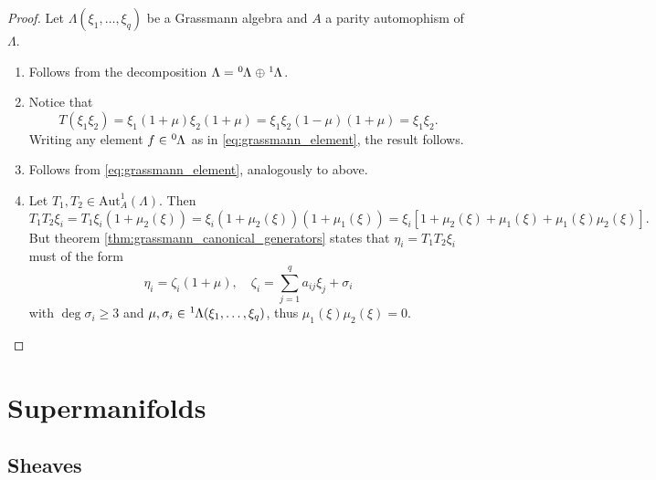 \documentclass{article}
\theoremstyle{definition}
\begin{document}
\begin{proof}
    Let $\Lambda(\xi_1, \dots, \xi_q)$ be a Grassmann algebra and $A$ a parity automophism of $\Lambda$.
    \begin{enumerate}
        \item Follows from the decomposition $\Lambda = \tensor[^0]{\Lambda}{} \oplus \tensor[^1]{\Lambda}{}$.
        \item Notice that
        \begin{equation*}
            T(\xi_1 \xi_2) = \xi_1(1 + \mu)\xi_2(1 + \mu) = \xi_1 \xi_2 (1 - \mu)(1 + \mu) = \xi_1 \xi_2.
        \end{equation*}
        Writing any element $f \in \tensor[^0]{\Lambda}{}$ as in \eqref{eq:grassmann_element}, the result follows.
        \item Follows from \eqref{eq:grassmann_element}, analogously to above.
        \item Let $T_1, T_2 \in \text{Aut}_A^1(\Lambda)$. Then
        \begin{equation*}
            T_1 T_2 \xi_i = T_1 \xi_i (1 + \mu_2(\xi))
            = \xi_i(1 + \mu_2(\xi))(1 + \mu_1(\xi))
            = \xi_i \left[1 + \mu_2(\xi) + \mu_1(\xi) + \mu_1(\xi) \mu_2(\xi) \right].
        \end{equation*}
        But theorem \ref{thm:grassmann_canonical_generators} states that $\eta_i = T_1 T_2 \xi_i$ must of the form
        \begin{equation*}
            \eta_i = \zeta_i ( 1 + \mu), \quad \zeta_i = \sum_{j = 1}^q a_{ij} \xi_j + \sigma_i
        \end{equation*}
        with $\deg \sigma_i \geq 3$ and $\mu, \sigma_i \in \tensor[^1]{\Lambda(\xi_1, \dots, \xi_q)}{}$, thus $\mu_1(\xi) \mu_2(\xi) = 0$.
    \end{enumerate}
\end{proof}






\newpage

\section{Supermanifolds}

\subsection{Sheaves}
\end{document}

